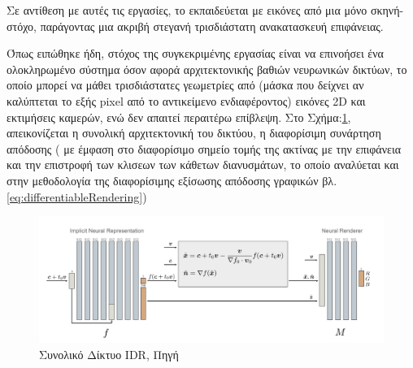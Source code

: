     Σε αντίθεση με αυτές τις εργασίες, το  εκπαιδεύεται με εικόνες από μια μόνο σκηνή-στόχο, παράγοντας μια ακριβή στεγανή τρισδιάστατη ανακατασκευή επιφάνειας. 
\par
    Όπως ειπώθηκε ήδη, στόχος της συγκεκριμένης εργασίας είναι να επινοήσει ένα ολοκληρωμένο σύστημα όσον αφορά αρχιτεκτονικής βαθιών νευρωνικών δικτύων, το οποίο μπορεί να μάθει τρισδιάστατες γεωμετρίες από  (μάσκα που δείχνει αν καλύπτεται το εξής pixel από το αντικείμενο ενδιαφέροντος) εικόνες 2D  και εκτιμήσεις καμερών, ενώ δεν απαιτεί περαιτέρω επίβλεψη. Στο Σχήμα:\ref{fig:idrnetwork}, απεικονίζεται η συνολική αρχιτεκτονική του δικτύου, η διαφορίσιμη συνάρτηση απόδοσης ( με έμφαση στο διαφορίσιμο σημείο τομής της ακτίνας με την επιφάνεια και την επιστροφή των κλισεων των κάθετων διανυσμάτων, το οποίο αναλύεται και στην μεθοδολογία της διαφορίσιμης εξίσωσης απόδοσης γραφικών βλ.\ref{eq:differentiableRendering})
    \begin{figure}[H]
        \centering
        \includegraphics[width = \linewidth]{images/chapter3_img/idr_network_architecture_2.jpg}
        \caption{Συνολικό Δίκτυο IDR, Πηγή \cite{yariv2020multiview}}
        \label{fig:idrnetwork}
    \end{figure}

